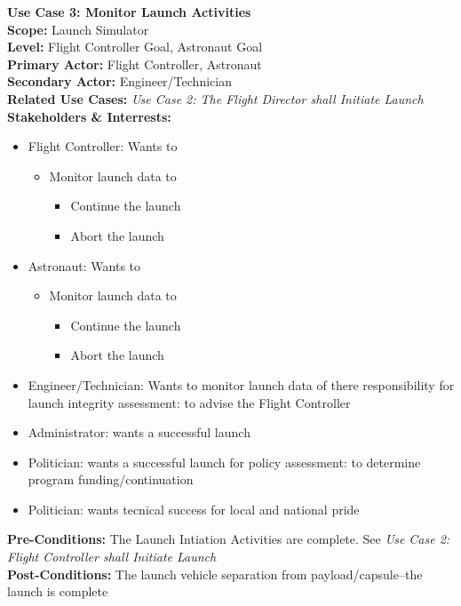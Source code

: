 \documentclass[letterpaper]{article}
\begin{document}
\noindent
\textbf{Use Case 3:  Monitor Launch Activities}\\
\textbf{Scope:  }Launch Simulator\\
\textbf{Level:  }Flight Controller Goal, Astronaut Goal\\
\textbf{Primary Actor:  }Flight Controller, Astronaut\\
\textbf{Secondary Actor:  }Engineer/Technician\\
\textbf{Related Use Cases:  }\textit{Use Case 2:  The Flight Director
shall Initiate Launch}\\
\textbf{Stakeholders \& Interrests:  }
\begin{itemize}
\item Flight Controller:  Wants to
\begin{itemize}
\item Monitor launch data to
\begin{itemize}
\item Continue the launch
\item Abort the launch
\end{itemize}
\end{itemize}
\item Astronaut:  Wants to 
\begin{itemize}
\item Monitor launch data to
\begin{itemize}
\item Continue the launch
\item Abort the launch
\end{itemize}
\end{itemize}
\item Engineer/Technician:  Wants to monitor launch data
of there responsibility for launch integrity assessment:  to advise
the Flight Controller
\item Administrator:  wants a successful launch
\item Politician:  wants a successful launch for policy assessment:
to determine program funding/continuation
\item Politician:  wants tecnical success for local and national pride
\end{itemize}
\textbf{Pre-Conditions:  }The Launch Intiation Activities are
complete.  See \textit{Use Case 2:  Flight Controller shall
Initiate Launch}\\
\textbf{Post-Conditions:  }The launch vehicle separation from
payload/capsule--the launch is complete\\\\
\end{document}
